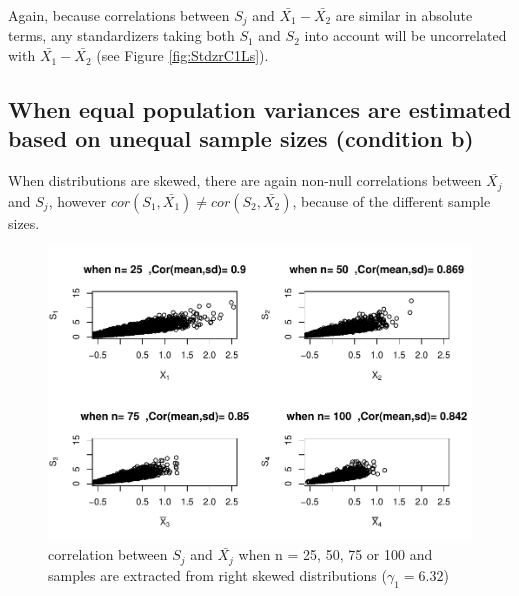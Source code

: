 \documentclass[
  man]{apa6}
\begin{document}
Again, because correlations between \(S_j\) and \(\bar{X_1}-\bar{X_2}\) are similar in absolute terms, any standardizers taking both \(S_1\) and \(S_2\) into account will be uncorrelated with \(\bar{X_1}-\bar{X_2}\) (see Figure \ref{fig:StdzrC1Ls}).

\hypertarget{when-equal-population-variances-are-estimated-based-on-unequal-sample-sizes-condition-b}{%
\subsection{When equal population variances are estimated based on unequal sample sizes (condition b)}\label{when-equal-population-variances-are-estimated-based-on-unequal-sample-sizes-condition-b}}

When distributions are skewed, there are again non-null correlations between \(\bar{X_j}\) and \(S_j\), however \(cor(S_1,\bar{X_1}) \neq cor(S_2,\bar{X_2})\), because of the different sample sizes.

\begin{figure}
\centering
\includegraphics{Correlations-between-the-sample-means-difference-and-standardizers-of-all-estimators,-and-implications-on-biases-and-variances-of-all-estimators_files/figure-latex/C2corn-1.pdf}
\caption{\label{fig:C2corn}correlation between \(S_j\) and \(\bar{X_j}\) when n = 25, 50, 75 or 100 and samples are extracted from right skewed distributions (\(\gamma_1 = 6.32\))}
\end{figure}
\end{document}
